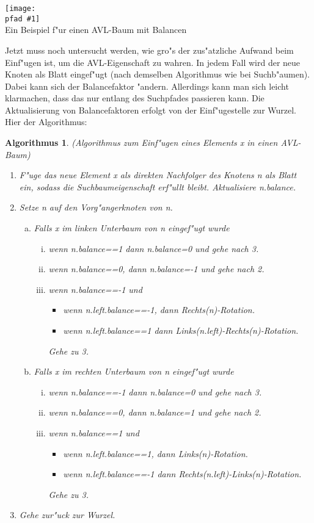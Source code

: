 \documentclass[a4paper,titlepage]{article}
\newtheorem{alg}{Algorithmus}
\newcommand{\pfad}{../pics/}
\newcommand{\centerpic}[3]{
	\begin{center}
		\texttt{[image: \\pfad \#1]} \\
		{\small #3}
	\end{center}
}
\begin{document}
\begin{appendix}
\centerpic{avlbsp}{5}{Ein Beispiel f"ur einen AVL-Baum mit Balancen}
\medskip
Jetzt muss noch untersucht werden, wie gro"s der zus"atzliche
Aufwand beim Einf"ugen ist, um die AVL-Eigenschaft zu wahren. In
jedem Fall wird der neue Knoten als Blatt eingef"ugt (nach
demselben Algorithmus wie bei Suchb"aumen). Dabei kann sich der
Balancefaktor "andern. Allerdings kann man sich leicht klarmachen,
dass das nur entlang des Suchpfades passieren kann. Die
Aktualisierung von Balancefaktoren erfolgt von der Einf"ugestelle
zur Wurzel. Hier der Algorithmus: 

\newpage
\begin{alg} \label{avlinsert}
(Algorithmus zum Einf"ugen eines Elements x in einen AVL-Baum)
\begin{enumerate}
\item F"uge das neue Element x als direkten Nachfolger des Knotens
n als Blatt ein, sodass die Suchbaumeigenschaft erf"ullt bleibt.
Aktualisiere n.balance.
\item Setze n auf den Vorg"angerknoten von
n.
    \begin{enumerate}[(a)]
    \item Falls x im linken Unterbaum von n eingef"ugt wurde
        \begin{enumerate}[(i)]
        \item wenn n.balance==1 dann n.balance=0 und gehe nach
        3.
        \item wenn n.balance==0, dann n.balance=-1 und gehe nach
        2.
        \item wenn n.balance==-1 und
            \begin{itemize}
            \item wenn n.left.balance==-1, dann Rechts(n)-Rotation.
            \item wenn n.left.balance==1 dann
            Links(n.left)-Rechts(n)-Rotation.
            \end{itemize}
            Gehe zu 3.
        \end{enumerate}
    \item Falls x im rechten Unterbaum von n eingef"ugt wurde
        \begin{enumerate}[(i)]
        \item wenn n.balance==-1 dann n.balance=0 und gehe nach
        3.
        \item wenn n.balance==0, dann n.balance=1 und gehe nach
        2.
        \item wenn n.balance==1 und
            \begin{itemize}
            \item wenn n.left.balance==1, dann Links(n)-Rotation.
            \item wenn n.left.balance==-1 dann
            Rechts(n.left)-Links(n)-Rotation.
            \end{itemize}
            Gehe zu 3.
        \end{enumerate}
    \end{enumerate}
    \item Gehe zur"uck zur Wurzel.
\end{enumerate}
\end{alg}


\end{appendix}
\end{document}

